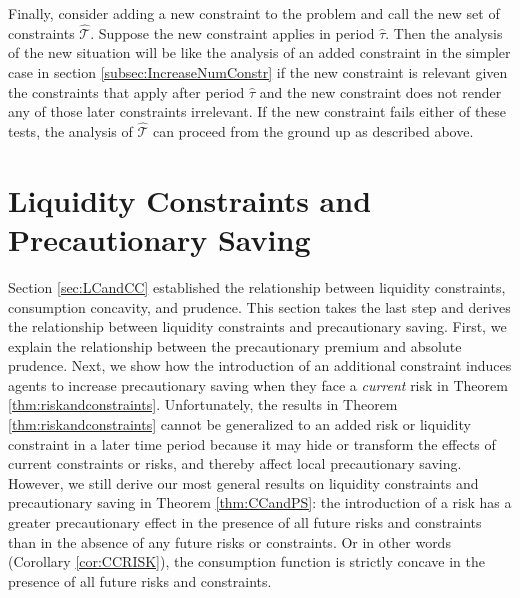 \documentclass[titlepage]{\econtex}
\begin{document}
  Finally, consider adding a new constraint to the problem and call the new set of constraints $\hat{\mathcal{T}}$.  Suppose the new constraint applies in period $\hat{\tau}$.  Then the analysis of the new situation will be like the analysis of an added constraint in the simpler case in section \ref{subsec:IncreaseNumConstr} if the new constraint is relevant given the constraints that apply after period $\hat{\tau}$ and the new constraint does not render any of those later constraints irrelevant. If the new constraint fails either of these tests, the analysis of $\hat{\mathcal{T}}$ can proceed from the ground up as described above.




\section{Liquidity Constraints and Precautionary Saving}
\label{sec:LCandPS}



\hypertarget{LCandPSIntro}{}
  Section \ref{sec:LCandCC} established the relationship between liquidity constraints, consumption concavity, and prudence. This section takes the last step and derives the relationship between liquidity constraints and precautionary saving. First, we explain the relationship between the precautionary premium and absolute prudence. Next, we show how the introduction of an additional constraint induces agents to increase precautionary saving when they face a \textit{current} risk in Theorem \ref{thm:riskandconstraints}. Unfortunately, the results in Theorem \ref{thm:riskandconstraints} cannot be generalized to an added risk or liquidity constraint in a later time period because it may hide or transform the effects of current constraints or risks, and thereby affect local precautionary saving. However, we still derive our most general results on liquidity constraints and precautionary saving in Theorem \ref{thm:CCandPS}: the introduction of a risk has a greater precautionary effect in the presence of all future risks and constraints than in the absence of any future risks or constraints. Or in other words (Corollary \ref{cor:CCRISK}), the consumption function is strictly concave in the presence of all future risks and constraints. 
  
  
\end{document}
